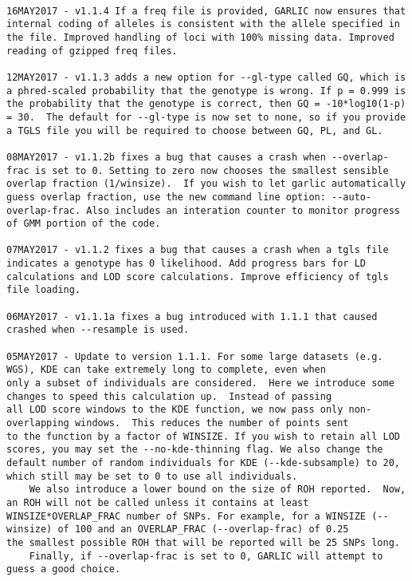 \documentclass[12pt]{article}%
\begin{document}
\begin{lstlisting}

16MAY2017 - v1.1.4 If a freq file is provided, GARLIC now ensures that internal coding of alleles is consistent with the allele specified in the file. Improved handling of loci with 100% missing data. Improved reading of gzipped freq files.

12MAY2017 - v1.1.3 adds a new option for --gl-type called GQ, which is a phred-scaled probability that the genotype is wrong. If p = 0.999 is the probability that the genotype is correct, then GQ = -10*log10(1-p) = 30.  The default for --gl-type is now set to none, so if you provide a TGLS file you will be required to choose between GQ, PL, and GL.

08MAY2017 - v1.1.2b fixes a bug that causes a crash when --overlap-frac is set to 0. Setting to zero now chooses the smallest sensible overlap fraction (1/winsize).  If you wish to let garlic automatically guess overlap fraction, use the new command line option: --auto-overlap-frac. Also includes an interation counter to monitor progress of GMM portion of the code.

07MAY2017 - v1.1.2 fixes a bug that causes a crash when a tgls file indicates a genotype has 0 likelihood. Add progress bars for LD calculations and LOD score calculations. Improve efficiency of tgls file loading.

06MAY2017 - v1.1.1a fixes a bug introduced with 1.1.1 that caused crashed when --resample is used.

05MAY2017 - Update to version 1.1.1. For some large datasets (e.g. WGS), KDE can take extremely long to complete, even when
only a subset of individuals are considered.  Here we introduce some changes to speed this calculation up.  Instead of passing
all LOD score windows to the KDE function, we now pass only non-overlapping windows.  This reduces the number of points sent
to the function by a factor of WINSIZE. If you wish to retain all LOD scores, you may set the --no-kde-thinning flag. We also change the default number of random individuals for KDE (--kde-subsample) to 20, which still may be set to 0 to use all individuals. 
	We also introduce a lower bound on the size of ROH reported.  Now, an ROH will not be called unless it contains at least
WINSIZE*OVERLAP_FRAC number of SNPs. For example, for a WINSIZE (--winsize) of 100 and an OVERLAP_FRAC (--overlap-frac) of 0.25
the smallest possible ROH that will be reported will be 25 SNPs long.
	Finally, if --overlap-frac is set to 0, GARLIC will attempt to guess a good choice.


\end{lstlisting}
\end{document}
